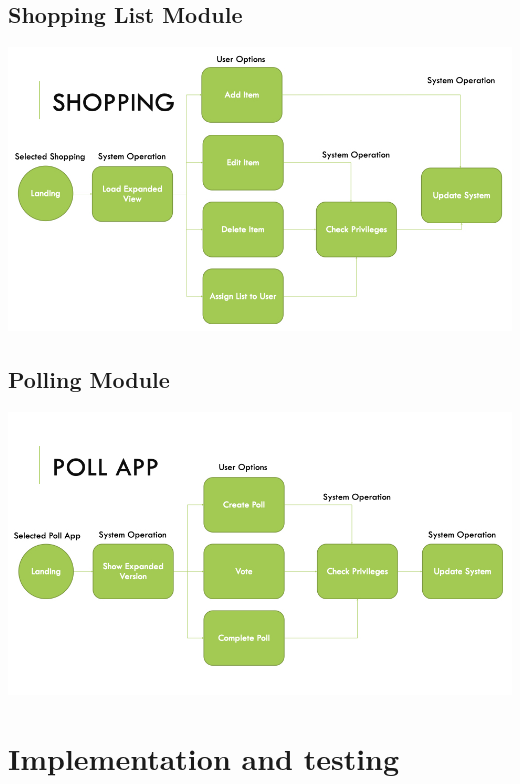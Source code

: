\documentclass[12pt]{article}
\begin{document}
\subsection{Shopping List Module}
\includegraphics[scale=0.45]{CSC450_Design.004.jpeg}
\subsection{Polling Module}
\includegraphics[scale=0.45]{CSC450_Design.005.jpeg}
\section {Implementation and testing}
\end{document}
